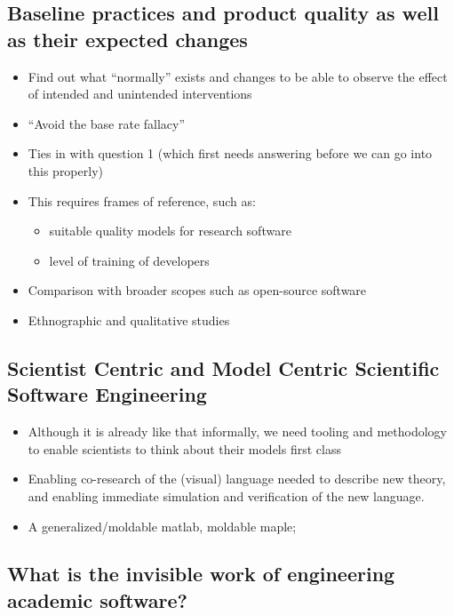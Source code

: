 \documentclass[a4paper,UKenglish]{dagman}
\begin{document}
\subsection{Baseline practices and product quality as well as their expected changes}


\begin{itemize}

\item Find out what ``normally'' exists  and changes to be able to observe the effect of intended and unintended interventions
\item ``Avoid the base rate fallacy''
\item Ties in with question 1 (which first needs answering before we can go into this properly)
\item This requires frames of reference, such as:

    \begin{itemize}
    \item suitable quality models for research software
    \item level of training of developers
    \end{itemize}

\item Comparison with broader scopes such as open-source software
\item Ethnographic and qualitative studies
\end{itemize}

\subsection{Scientist Centric and Model Centric Scientific Software Engineering}


\begin{itemize}
\item Although it is already like that informally, we need tooling and methodology to enable scientists to think about their models first class
\item Enabling co-research of the (visual) language needed to describe new theory, and enabling immediate simulation and verification of the new language.
\item A generalized/moldable matlab, moldable maple;
\end{itemize}

\subsection{What is the invisible work of engineering academic software?}
\end{document}
